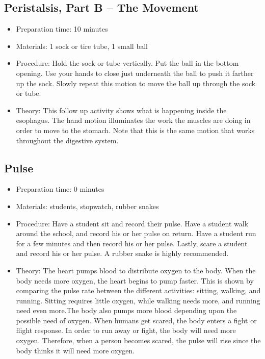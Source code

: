 \subsection{Peristalsis, Part B -- The Movement}
\begin{itemize}
\item{Preparation time: 10 minutes}
\item{Materials: 1 sock or tire tube, 1 small ball}
\item{Procedure: Hold the sock or tube vertically. Put the ball in the bottom opening. Use your hands to close just underneath the ball to push it farther up the sock. Slowly repeat this motion to move the ball up through the sock or tube.}
\item{Theory: This follow up activity shows what is happening inside the esophagus. The hand motion illuminates the work the muscles are doing in order to move to the stomach. Note that this is the same motion that works throughout the digestive system.}
\end{itemize}

\subsection{Pulse}
\begin{itemize}
\item{Preparation time: 0 minutes}
\item{Materials: students, stopwatch, rubber snakes}
\item{Procedure: Have a student sit and record their pulse. Have a student walk around the school, and record his or her pulse on return. Have a student run for a few minutes and then record his or her pulse. Lastly, scare a student and record his or her pulse. A rubber snake is highly recommended.}
\item{Theory: The heart pumps blood to distribute oxygen to the body. When the body needs more oxygen, the heart begins to pump faster. This is shown by comparing the pulse rate between the different activities: sitting, walking, and running. Sitting requires little oxygen, while walking needs more, and running need even more.The body also pumps more blood depending upon the possible need of oxygen. When humans get scared, the body enters a fight or flight response. In order to run away or fight, the body will need more oxygen. Therefore, when a person becomes scared, the pulse will rise since the body thinks it will need more oxygen.}
\end{itemize}


